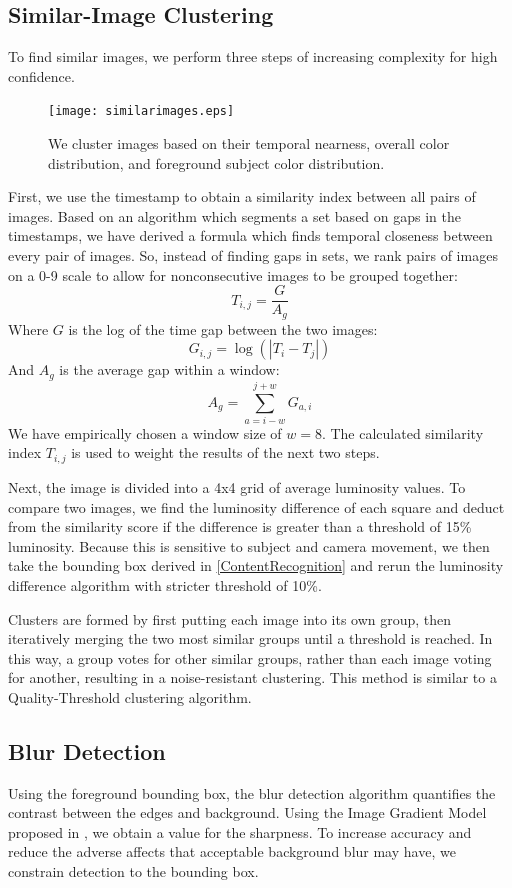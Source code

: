 \documentclass{article}
\begin{document}
\subsection{Similar-Image Clustering}
To find similar images, we perform three steps of increasing complexity for high confidence.
\begin{figure}
  \centering
    \texttt{[image: similarimages.eps]}
  \caption{We cluster images based on their temporal nearness, overall color distribution, and foreground subject color distribution.}
\end{figure}
First, we use the timestamp to obtain a similarity index between all pairs of images. Based on an algorithm which segments a set based on gaps in the timestamps\cite{1292402}, we have derived a formula which finds temporal closeness between every pair of images. So, instead of finding gaps in sets, we rank pairs of images on a 0-9 scale to allow for nonconsecutive images to be grouped together:
\[
T_{i,j}=\frac{G}{A_g}
\]
Where \(G\) is the log of the time gap between the two images:
\[
G_{i,j}=\log(|T_i-T_j|)
\]
And \(A_g\) is the average gap within a window:
\[
A_g=\displaystyle\sum\limits_{a={i-w}}^{j+w}G_{a,i}
\]
We have empirically chosen a window size of \(w=8\).
The calculated similarity index \(T_{i,j}\) is used to weight the results of the next two steps.

Next, the image is divided into a 4x4 grid of average luminosity values. To compare two images, we find the luminosity difference of each square and deduct from the similarity score if the difference is greater than a threshold of 15\% luminosity. Because this is sensitive to subject and camera movement, we then take the bounding box derived in \ref{ContentRecognition} and rerun the luminosity difference algorithm with stricter threshold of 10\%.

Clusters are formed by first putting each image into its own group, then iteratively merging the two most similar groups until a threshold is reached. In this way, a group votes for other similar groups, rather than each image voting for another, resulting in a noise-resistant clustering. This method is similar to a Quality-Threshold clustering algorithm. %

\subsection{Blur Detection}
Using the foreground bounding box, the blur detection algorithm quantifies the contrast between the edges and background. Using the Image Gradient Model proposed in \cite{springerlink:10.1007/978-3-540-77409-9_26}, we obtain a value for the sharpness. To increase accuracy and reduce the adverse affects that acceptable background blur may have, we constrain detection to the bounding box.
\end{document}
